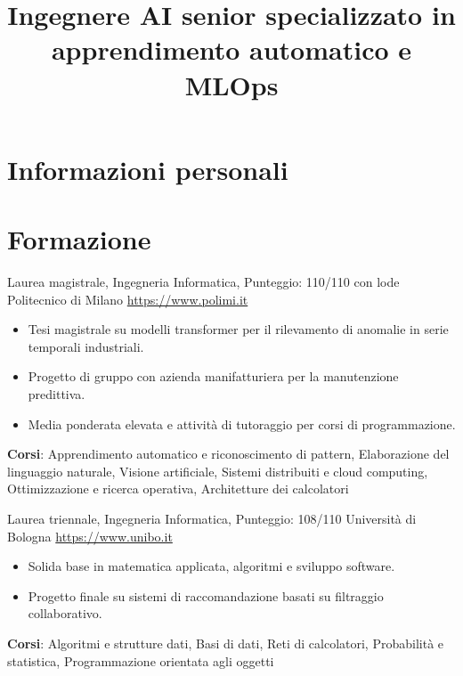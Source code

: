 \documentclass[a4paper, serif, 10pt]{moderncv}
\title{Ingegnere AI senior specializzato in apprendimento automatico e MLOps}
\begin{document}
\maketitle

\section{Informazioni personali}

\section{Formazione}

        {Laurea magistrale, Ingegneria Informatica, Punteggio: 110/110 con lode}
        {Politecnico di Milano}
        {\url{https://www.polimi.it}}
        {}
        {\begin{itemize}
\item Tesi magistrale su modelli transformer per il rilevamento di anomalie in serie temporali industriali.
\item Progetto di gruppo con azienda manifatturiera per la manutenzione predittiva.
\item Media ponderata elevata e attività di tutoraggio per corsi di programmazione.
\end{itemize}
\textbf{Corsi}: Apprendimento automatico e riconoscimento di pattern, Elaborazione del linguaggio naturale, Visione artificiale, Sistemi distribuiti e cloud computing, Ottimizzazione e ricerca operativa, Architetture dei calcolatori}

        {Laurea triennale, Ingegneria Informatica, Punteggio: 108/110}
        {Università di Bologna}
        {\url{https://www.unibo.it}}
        {}
        {\begin{itemize}
\item Solida base in matematica applicata, algoritmi e sviluppo software.
\item Progetto finale su sistemi di raccomandazione basati su filtraggio collaborativo.
\end{itemize}
\textbf{Corsi}: Algoritmi e strutture dati, Basi di dati, Reti di calcolatori, Probabilità e statistica, Programmazione orientata agli oggetti}
\end{document}
